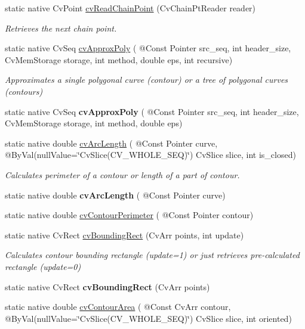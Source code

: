 \begin{DoxyCompactItemize}
static native Cv\+Point \hyperlink{group__imgproc__c_ga60ca24d0d962737958150406351d91c7}{cv\+Read\+Chain\+Point} (Cv\+Chain\+Pt\+Reader reader)
\begin{DoxyCompactList}\small\item\em Retrieves the next chain point. \end{DoxyCompactList}\item 
static native Cv\+Seq \hyperlink{group__imgproc__c_ga04330d92548cde6503b33785252af580}{cv\+Approx\+Poly} ( @Const Pointer src\+\_\+seq, int header\+\_\+size, Cv\+Mem\+Storage storage, int method, double eps, int recursive)
\begin{DoxyCompactList}\small\item\em Approximates a single polygonal curve (contour) or a tree of polygonal curves (contours) \end{DoxyCompactList}\item 
static native Cv\+Seq {\bfseries cv\+Approx\+Poly} ( @Const Pointer src\+\_\+seq, int header\+\_\+size, Cv\+Mem\+Storage storage, int method, double eps)
\item 
static native double \hyperlink{group__imgproc__c_gaf095420cca062536116edaad5f0391ae}{cv\+Arc\+Length} ( @Const Pointer curve, @By\+Val(null\+Value=\char`\"{}Cv\+Slice(C\+V\+\_\+\+W\+H\+O\+L\+E\+\_\+\+S\+EQ)\char`\"{}) Cv\+Slice slice, int is\+\_\+closed)
\begin{DoxyCompactList}\small\item\em Calculates perimeter of a contour or length of a part of contour. \end{DoxyCompactList}\item 
static native double {\bfseries cv\+Arc\+Length} ( @Const Pointer curve)
\item 
static native double \hyperlink{group__imgproc__c_ga420bd05e2f839e52bdb1db41cea427af}{cv\+Contour\+Perimeter} ( @Const Pointer contour)
\item 
static native Cv\+Rect \hyperlink{group__imgproc__c_ga83c0146f56d5c70d0eb462023220933e}{cv\+Bounding\+Rect} (Cv\+Arr points, int update)
\begin{DoxyCompactList}\small\item\em Calculates contour bounding rectangle (update=1) or just retrieves pre-\/calculated rectangle (update=0) \end{DoxyCompactList}\item 
static native Cv\+Rect {\bfseries cv\+Bounding\+Rect} (Cv\+Arr points)
\item 
static native double \hyperlink{group__imgproc__c_gad23835119946d5ed21a357412881bb58}{cv\+Contour\+Area} ( @Const Cv\+Arr contour, @By\+Val(null\+Value=\char`\"{}Cv\+Slice(C\+V\+\_\+\+W\+H\+O\+L\+E\+\_\+\+S\+EQ)\char`\"{}) Cv\+Slice slice, int oriented)

\end{DoxyCompactItemize}
